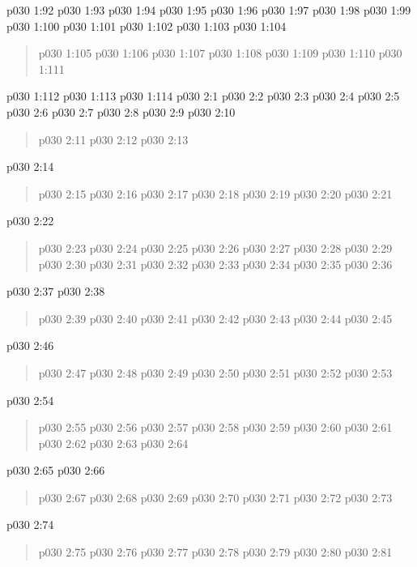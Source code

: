 \vsetspace
\vs p030 1:92 
\vs p030 1:93 
\vs p030 1:94 
\vs p030 1:95 
\vs p030 1:96 
\vs p030 1:97 
\vs p030 1:98 
\vs p030 1:99 \pc 
\vsetspace
\vs p030 1:100 
\vs p030 1:101 
\vs p030 1:102 
\vsetspace
\vs p030 1:103 
\vsetspace
\vs p030 1:104 
\begin{quote}
\vs p030 1:105 
\vs p030 1:106 
\vs p030 1:107 
\vs p030 1:108 
\vs p030 1:109 
\vs p030 1:110 
\vs p030 1:111 
\end{quote}
\vs p030 1:112 \pc 
\vs p030 1:113 
\vs p030 1:114 \pc 
{}
\vs p030 2:1 
\vs p030 2:2 
\vs p030 2:3 
\vs p030 2:4 
\vs p030 2:5 
\vs p030 2:6 
\vs p030 2:7 
\vs p030 2:8 
\vs p030 2:9 \pc 
\vsetspace
\vs p030 2:10 
\begin{quote}
\vs p030 2:11 
\vs p030 2:12 
\vs p030 2:13 
\end{quote}
\vsetspace
\vs p030 2:14 
\begin{quote}
\vs p030 2:15 
\vs p030 2:16 
\vs p030 2:17 
\vs p030 2:18 
\vs p030 2:19 
\vs p030 2:20 
\vs p030 2:21 
\end{quote}
\vsetspace
\vs p030 2:22 
\begin{quote}
\vs p030 2:23 
\vs p030 2:24 
\vs p030 2:25 
\vs p030 2:26 
\vs p030 2:27 
\vs p030 2:28 
\vs p030 2:29 
\vs p030 2:30 
\vs p030 2:31 
\vs p030 2:32 
\vs p030 2:33 
\vs p030 2:34 
\vs p030 2:35 
\vs p030 2:36 
\end{quote}
\vsetspace
\vs p030 2:37 
\vsetspace
\vs p030 2:38 
\begin{quote}
\vs p030 2:39 
\vs p030 2:40 
\vs p030 2:41 
\vs p030 2:42 
\vs p030 2:43 
\vs p030 2:44 
\vs p030 2:45 
\end{quote}
\vsetspace
\vs p030 2:46 
\begin{quote}
\vs p030 2:47 
\vs p030 2:48 
\vs p030 2:49 
\vs p030 2:50 
\vs p030 2:51 
\vs p030 2:52 
\vs p030 2:53 
\end{quote}
\vsetspace
\vs p030 2:54 
\begin{quote}
\vs p030 2:55 
\vs p030 2:56 
\vs p030 2:57 
\vs p030 2:58 
\vs p030 2:59 
\vs p030 2:60 
\vs p030 2:61 
\vs p030 2:62 
\vs p030 2:63 
\vs p030 2:64 
\end{quote}
\vsetspace
\vs p030 2:65 
\vsetspace
\vs p030 2:66 
\begin{quote}
\vs p030 2:67 
\vs p030 2:68 
\vs p030 2:69 
\vs p030 2:70 
\vs p030 2:71 
\vs p030 2:72 
\vs p030 2:73 
\end{quote}
\vsetspace
\vs p030 2:74 
\begin{quote}
\vs p030 2:75 
\vs p030 2:76 
\vs p030 2:77 
\vs p030 2:78 
\vs p030 2:79 
\vs p030 2:80 
\vs p030 2:81 
\end{quote}
